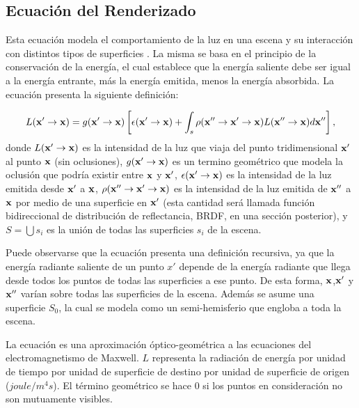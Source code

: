 \subsection{Ecuación del Renderizado}

Esta ecuación modela el comportamiento de la luz en una escena y su interacción con distintos tipos de superficies \cite{Kajiya1986}.
La misma se basa en el principio de la conservación de la energía, el cual establece que la energía saliente debe ser igual a la energía entrante, más la energía emitida, menos la energía absorbida.
La ecuación presenta la siguiente definición:

\begin{equation}
L(\bold{x'} \rightarrow \bold{x}) =  g(\bold{x'}  \rightarrow \bold{x})  \left[ \epsilon(\bold{x'}  \rightarrow \bold{x}) + \int_{s}{\rho(\bold{x''}  \rightarrow \bold{x'}  \rightarrow \bold{x})L(\bold{x''}  \rightarrow \bold{x}) d\bold{x''}} \right],
\end{equation}
donde $L(\bold{x'} \rightarrow \bold{x})$ es la intensidad de la luz que viaja del punto tridimensional $\bold{x'}$ al punto $\bold{x}$ (sin oclusiones), $g(\bold{x'} \rightarrow \bold{x})$ es un termino geométrico que modela la oclusión que podría existir entre $\bold{x}$ y $\bold{x'}$, $\epsilon(\bold{x'} \rightarrow \bold{x})$ es la intensidad de la luz emitida desde $\bold{x'}$ a $\bold{x}$, $\rho(\bold{x''}  \rightarrow \bold{x'}  \rightarrow \bold{x})$ es la intensidad de la luz emitida de $\bold{x''}$ a $\bold{x}$ por medio de una superficie en $\bold{x'}$ (esta cantidad será llamada función bidireccional de distribución de reflectancia, \acrshort{BRDF}, en una sección posterior), y $S=\bigcup{s_{i}}$ es la unión de todas las superficies $s_{i}$ de la escena.


Puede observarse que la ecuación presenta una definición recursiva, ya que la energía radiante saliente de un punto $x'$ depende de la energía radiante que llega desde todos los puntos de todas las superficies a ese punto.
De esta forma, $\bold{x}$,$\bold{x'}$ y $\bold{x''}$ varían sobre todas las superficies de la escena.
Además se asume una superficie $S_{0}$, la cual se modela como un semi-hemisferio que engloba a toda la escena.

La ecuación es una aproximación óptico-geométrica a las ecuaciones del electromagnetismo de Maxwell.
$L$ representa la radiación de energía por unidad de tiempo por unidad de superficie de destino por unidad de superficie de origen ($joule/m^{4} s$).
El término geométrico se hace $0$ si los puntos en consideración no son mutuamente visibles.

